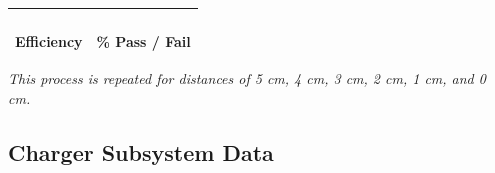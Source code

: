 \documentclass[12pt]{article}
\begin{document}
\begin{appendices}
\begin{table}[h!]
\begin{tabular}{ | c | c | }
\hline
\parbox{0.5\linewidth}{\raggedright \hfill \\[-0.25 em]
Efficiency
\hfill \\[0.1 em]} &  \parbox{0.4\linewidth}{\raggedright \hfill \\ [0.7 em]\underline{\hspace{0.625in}} 
 \%
\hspace{0.125 in}Pass \space / \space  Fail \hfill \\ [0.3 em]} \\ 
\hline
\end{tabular}
\end{table}
\noindent
\textit{This process is repeated for distances of 5 cm, 4 cm, 3 cm, 2 cm, 1 cm, and 0 cm.}

\subsection{Charger Subsystem Data}


\end{appendices}
\end{document}
